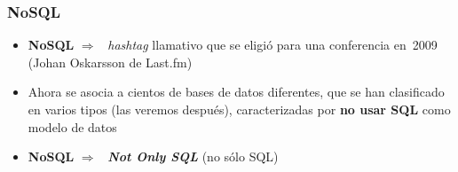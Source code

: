 \documentclass[14pt]{beamer}
\newcommand{\ra}{{\color{mdwrojo} $\Rightarrow${}~{}}}
\begin{document}
\begin{frame}
  \frametitle{NoSQL}
\begin{itemize}
\item {\bf NoSQL} \ra{} {\em hashtag\/} llamativo que se
  eligió para una conferencia en~2009 (Johan Oskarsson de Last.fm)
\item Ahora se asocia a cientos de bases de datos diferentes,
  que se han clasificado en varios tipos (las veremos después),
  caracterizadas por {\bf no usar SQL} como modelo de datos
\item {\bf NoSQL} \ra{} {\bfseries\itshape Not Only SQL} (no sólo SQL)
  \end{itemize}
\end{frame}



\end{document}

